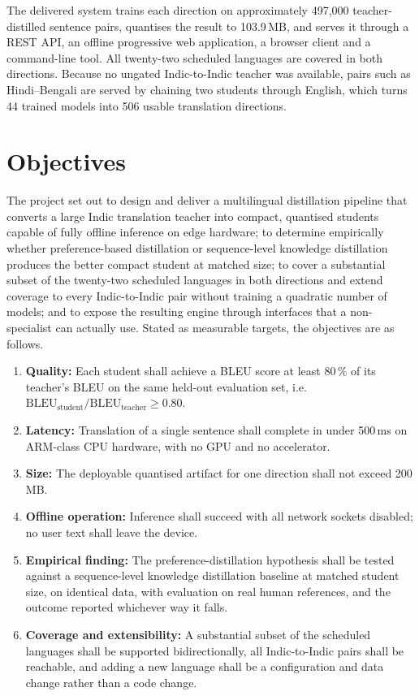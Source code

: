 The delivered system trains each direction on approximately 497{,}000
teacher-distilled sentence pairs, quantises the result to 103.9\,MB, and serves
it through a REST API, an offline progressive web application, a browser client
and a command-line tool. All twenty-two scheduled languages are covered in both
directions. Because no ungated Indic-to-Indic teacher was available, pairs such
as Hindi--Bengali are served by chaining two students through English, which
turns 44 trained models into 506 usable translation directions.

\section{Objectives}
\label{sec:objectives}

The project set out to design and deliver a multilingual distillation pipeline
that converts a large Indic translation teacher into compact, quantised students
capable of fully offline inference on edge hardware; to determine empirically
whether preference-based distillation or sequence-level knowledge distillation
produces the better compact student at matched size; to cover a substantial
subset of the twenty-two scheduled languages in both directions and extend
coverage to every Indic-to-Indic pair without training a quadratic number of
models; and to expose the resulting engine through interfaces that a
non-specialist can actually use. Stated as measurable targets, the objectives
are as follows.

\begin{enumerate}[label=\textbf{\arabic*.}, leftmargin=0.55in]
  \item \textbf{Quality:} Each student shall achieve a BLEU score at least
        80\,\% of its teacher's BLEU on the same held-out evaluation set, i.e.\
        $\text{BLEU}_{\text{student}} / \text{BLEU}_{\text{teacher}} \geq 0.80$.
  \item \textbf{Latency:} Translation of a single sentence shall complete in
        under 500\,ms on ARM-class CPU hardware, with no GPU and no accelerator.
  \item \textbf{Size:} The deployable quantised artifact for one direction shall
        not exceed 200\,MB.
  \item \textbf{Offline operation:} Inference shall succeed with all network
        sockets disabled; no user text shall leave the device.
  \item \textbf{Empirical finding:} The preference-distillation hypothesis shall
        be tested against a sequence-level knowledge distillation baseline at
        matched student size, on identical data, with evaluation on real human
        references, and the outcome reported whichever way it falls.
  \item \textbf{Coverage and extensibility:} A substantial subset of the
        scheduled languages shall be supported bidirectionally, all
        Indic-to-Indic pairs shall be reachable, and adding a new language shall
        be a configuration and data change rather than a code change.
\end{enumerate}

